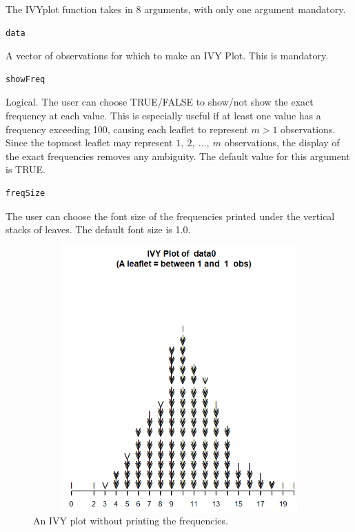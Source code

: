 The IVYplot function takes in 8 arguments, with only one argument
mandatory.

\begin{verbatim}
data
\end{verbatim}

A vector of observations for which to make an IVY Plot. This is
mandatory.

\begin{verbatim}
showFreq
\end{verbatim}

Logical. The user can choose TRUE/FALSE to show/not show the exact
frequency at each value. This is especially useful if at least one value
has a frequency exceeding 100, causing each leaflet to represent \(m>1\)
observations. Since the topmost leaflet may represent
\(1,\ 2,\ \ldots,\ m\) observations, the display of the exact
frequencies removes any ambiguity. The default value for this argument
is TRUE.

\begin{verbatim}
freqSize
\end{verbatim}

The user can choose the font size of the frequencies printed under the
vertical stacks of leaves. The default font size is 1.0.

\begin{Schunk}
\begin{figure}[htbp]

{\centering \includegraphics[width=5in,height=4in]{Without_frequency} 

}

\caption[An IVY plot without printing the frequencies]{An IVY plot without printing the frequencies.}\label{fig:unnamed-chunk-1}
\end{figure}
\end{Schunk}

